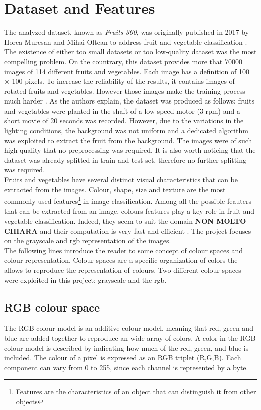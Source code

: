 \documentclass{article}
\begin{document}
\section{Dataset and Features}
The analyzed dataset, known as \textit{Fruits 360}, was originally published in 2017  by Horea Muresan and Mihai Oltean to address fruit and vegetable classification \cite{dataset}. The existence of either too small datasets or too low-quality dataset was the most compelling problem.  On the countrary, this dataset provides more that 70000 images of 114 different fruits and vegetables. Each image has a definition of 100 $\times$ 100 pixels. To increase the reliability of the results, it contains images of rotated fruits and vegetables. However those images make the training process much harder .
As the authors explain, the dataset was produced as follows: fruits and vegetables were planted in the shaft of a low speed motor (3 rpm) and a short movie of 20 seconds was recorded. However, due to the variations in the lighting conditions, the background was not uniform and a dedicated algorithm was exploited to extract the fruit from the background. The images were of such high quality that no preprocessing was required.
It is also worth noticing that the dataset was already splitted in train and test set, therefore no further splitting was required.\\
Fruits and vegetables have several distinct visual characteristics that can be extracted from the images. Colour, shape, size and texture are the most commonly used features\footnote{Features are the characteristics of an object that can distinguish it from other objects} in image classification.  Among all the possible feauters that can be extracted from an image, colours features play a key role in fruit and vegetable classification. Indeed, they seem to suit the domain \textbf{NON MOLTO CHIARA} and their computation is very fast and efficient \cite{review}. The project focuses on the grayscale and rgb representation of the images. \\
The following lines introduce the reader to some concept of colour spaces and colour representation.
Colour spaces are a specific organization of colors the allows to  reproduce the representation of colours. Two different colour spaces were exploited in this project: grayscale and the rgb.
\subsection{RGB colour space}
The RGB colour model is an additive colour model, meaning that red, green and blue are added together to reproduce an wide array of colors. A color in the RGB colour model is described by indicating how much of the red, green, and blue is included. The colour of a pixel is expressed as an RGB triplet (R,G,B). Each component can vary from 0 to 255, since each channel is represented by a byte.
\end{document}

